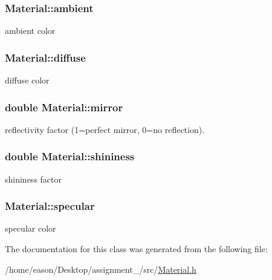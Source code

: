 \subsubsection[{\texorpdfstring{ambient}{ambient}}]{ Material\+::ambient}\hypertarget{structMaterial_a7b24ee4bc74363181053123fd99e180c}{}\label{structMaterial_a7b24ee4bc74363181053123fd99e180c}


ambient color 

\subsubsection[{\texorpdfstring{diffuse}{diffuse}}]{ Material\+::diffuse}\hypertarget{structMaterial_a17ee727d124d7a47afd6038e09fe76dd}{}\label{structMaterial_a17ee727d124d7a47afd6038e09fe76dd}


diffuse color 

\subsubsection[{\texorpdfstring{mirror}{mirror}}]{\setlength{\rightskip}{0pt plus 5cm}double Material\+::mirror}\hypertarget{structMaterial_a0dbe6293086abea5d497ec9000ab9f0a}{}\label{structMaterial_a0dbe6293086abea5d497ec9000ab9f0a}


reflectivity factor (1=perfect mirror, 0=no reflection). 

\subsubsection[{\texorpdfstring{shininess}{shininess}}]{\setlength{\rightskip}{0pt plus 5cm}double Material\+::shininess}\hypertarget{structMaterial_a3ebd453f91d79ab97ec25632d3ba5959}{}\label{structMaterial_a3ebd453f91d79ab97ec25632d3ba5959}


shininess factor 

\subsubsection[{\texorpdfstring{specular}{specular}}]{ Material\+::specular}\hypertarget{structMaterial_ab98526482184fa4cab89a33f6c13d033}{}\label{structMaterial_ab98526482184fa4cab89a33f6c13d033}


specular color 



The documentation for this class was generated from the following file\+:\begin{DoxyCompactItemize}
\item 
/home/eason/\+Desktop/assignment\+\_/src/\hyperlink{Material_8h}{Material.\+h}\end{DoxyCompactItemize}
